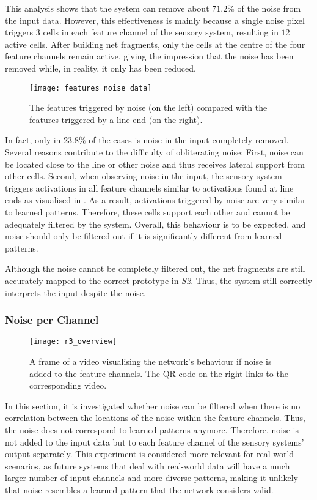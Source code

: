 This analysis shows that the system can remove about $71.2\%$ of the noise from the input data. However, this effectiveness is mainly because a single noise pixel triggers $3$ cells in each feature channel of the sensory system, resulting in $12$ active cells. After building net fragments, only the cells at the centre of the four feature channels remain active, giving the impression that the noise has been removed while, in reality, it only has been reduced.

\begin{figure}[h]
    \centering
    \texttt{[image: features\_noise\_data]}
    \caption[Features triggered by noise]{The features triggered by noise (on the left) compared with the features triggered by a line end (on the right).}
\end{figure}
%
In fact, only in $23.8\%$ of the cases is noise in the input completely removed.
Several reasons contribute to the difficulty of obliterating noise: First, noise can be located close to the line or other noise and thus receives lateral support from other cells. Second, when observing noise in the input, the sensory system triggers activations in all feature channels similar to activations found at line ends as visualised in .
As a result, activations triggered by noise are very similar to learned patterns. Therefore, these cells support each other and cannot be adequately filtered by the system.
Overall, this behaviour is to be expected, and noise should only be filtered out if it is significantly different from learned patterns.

Although the noise cannot be completely filtered out, the net fragments are still accurately mapped to the correct prototype in \emph{S2}. Thus, the system still correctly interprets the input despite the noise.

\subsubsection{Noise per Channel}
%
\begin{figure}[h]
    \centering
    \texttt{[image: r3\_overview]}
    \caption[Video visualising the network's behaviour with noise in the feature channels]{A frame of a video visualising the network's behaviour if noise is added to the feature channels. The QR code on the right links to the corresponding video.}
\end{figure}
%
In this section, it is investigated whether noise can be filtered when there is no correlation between the locations of the noise within the feature channels.
Thus, the noise does not correspond to learned patterns anymore.
Therefore, noise is not added to the input data but to each feature channel of the sensory systems' output separately.
This experiment is considered more relevant for real-world scenarios, as future systems that deal with real-world data will have a much larger number of input channels and more diverse patterns, making it unlikely that noise resembles a learned pattern that the network considers valid.

